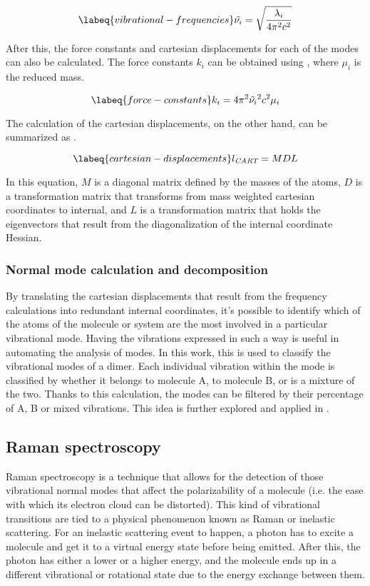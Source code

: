 \begin{equation}
    \labeq{vibrational-frequencies}
    \tilde{\nu_i} = \sqrt{\frac{\lambda_i}{4 \pi^2 c^2}}
\end{equation}

After this, the force constants and cartesian displacements for each of the modes can also be calculated.
The force constants $k_i$ can be obtained using , where $\mu_i$ is the reduced mass.

\begin{equation}
    \labeq{force-constants}
    k_i =  4 \pi^2 \tilde{\nu_i}^2 c^2 \mu_i
\end{equation}

The calculation of the cartesian displacements, on the other hand, can be summarized as .

\begin{equation}
    \labeq{cartesian-displacements}
    l_\textit{CART} = MDL
\end{equation}

In this equation, $M$ is a diagonal matrix defined by the masses of the atoms, $D$ is a transformation matrix that transforms from mass weighted cartesian coordinates to internal, and $L$ is a transformation matrix that holds the eigenvectors that result from the diagonalization of the internal coordinate Hessian.

\subsubsection{Normal mode calculation and decomposition}
By translating the cartesian displacements that result from the frequency calculations into redundant internal coordinates, it's possible to identify which of the atoms of the molecule or system are the most involved in a particular vibrational mode.
Having the vibrations expressed in such a way is useful in automating the analysis of modes.
In this work, this is used to classify the vibrational modes of a dimer.
Each individual vibration within the mode is classified by whether it belongs to molecule A, to molecule B, or is a mixture of the two.
Thanks to this calculation, the modes can be filtered by their percentage of A, B or mixed vibrations.
This idea is further explored and applied in .

\subsection{Raman spectroscopy}
Raman spectroscopy is a technique that allows for the detection of those vibrational normal modes that affect the polarizability of a molecule (i.e. the ease with which its electron cloud can be distorted).
This kind of vibrational transitions are tied to a physical phenomenon known as Raman or inelastic scattering.
For an inelastic scattering event to happen, a photon has to excite a molecule and get it to a virtual energy state before being emitted.
After this, the photon has either a lower or a higher energy, and the molecule ends up in a different vibrational or rotational state due to the energy exchange between them.

